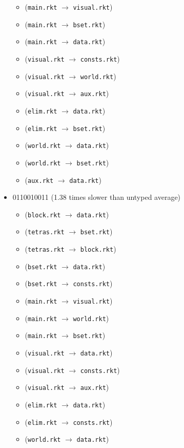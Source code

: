 \documentclass{article}
\newcommand{\mono}[1]{\texttt{#1}}
\begin{document}
\begin{itemize}
\begin{itemize}
  \item (\mono{main.rkt} $\rightarrow$ \mono{visual.rkt})
  \item (\mono{main.rkt} $\rightarrow$ \mono{bset.rkt})
  \item (\mono{main.rkt} $\rightarrow$ \mono{data.rkt})
  \item (\mono{visual.rkt} $\rightarrow$ \mono{consts.rkt})
  \item (\mono{visual.rkt} $\rightarrow$ \mono{world.rkt})
  \item (\mono{visual.rkt} $\rightarrow$ \mono{aux.rkt})
  \item (\mono{elim.rkt} $\rightarrow$ \mono{data.rkt})
  \item (\mono{elim.rkt} $\rightarrow$ \mono{bset.rkt})
  \item (\mono{world.rkt} $\rightarrow$ \mono{data.rkt})
  \item (\mono{world.rkt} $\rightarrow$ \mono{bset.rkt})
  \item (\mono{aux.rkt} $\rightarrow$ \mono{data.rkt})
  \end{itemize}
\item 0110010011 (1.38 times slower than untyped average)
  \begin{itemize}
  \item (\mono{block.rkt} $\rightarrow$ \mono{data.rkt})
  \item (\mono{tetras.rkt} $\rightarrow$ \mono{bset.rkt})
  \item (\mono{tetras.rkt} $\rightarrow$ \mono{block.rkt})
  \item (\mono{bset.rkt} $\rightarrow$ \mono{data.rkt})
  \item (\mono{bset.rkt} $\rightarrow$ \mono{consts.rkt})
  \item (\mono{main.rkt} $\rightarrow$ \mono{visual.rkt})
  \item (\mono{main.rkt} $\rightarrow$ \mono{world.rkt})
  \item (\mono{main.rkt} $\rightarrow$ \mono{bset.rkt})
  \item (\mono{visual.rkt} $\rightarrow$ \mono{data.rkt})
  \item (\mono{visual.rkt} $\rightarrow$ \mono{consts.rkt})
  \item (\mono{visual.rkt} $\rightarrow$ \mono{aux.rkt})
  \item (\mono{elim.rkt} $\rightarrow$ \mono{data.rkt})
  \item (\mono{elim.rkt} $\rightarrow$ \mono{consts.rkt})
  \item (\mono{world.rkt} $\rightarrow$ \mono{data.rkt})

\end{itemize}
\end{itemize}
\end{document}
